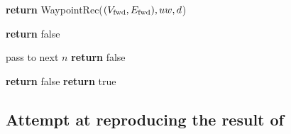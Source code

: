 \documentclass[conference]{IEEEtran} %
\begin{document}
\begin{algorithm}[ht]
  \caption{Check function for the waypoint property (See Table \ref{tab:props})}\label{alg:checkWaypoint}
  \begin{algorithmic}[1]

		\State \textbf{return} WaypointRec($(V_\textnormal{fwd}, E_\textnormal{fwd}), u w, d$)
    \EndProcedure


			\State \textbf{return} false
		\EndIf

		 

			\State pass to next $n$
		\EndIf
			\State \textbf{return} false
		\EndIf

		\State \textbf{return} false
		\EndIf
    \EndFor
	\State \textbf{return} true
    \EndProcedure

  \end{algorithmic}
\end{algorithm}


\subsection{Attempt at reproducing the result of \cite{NetPowProp}}\label{app:attempt}
\end{document}
